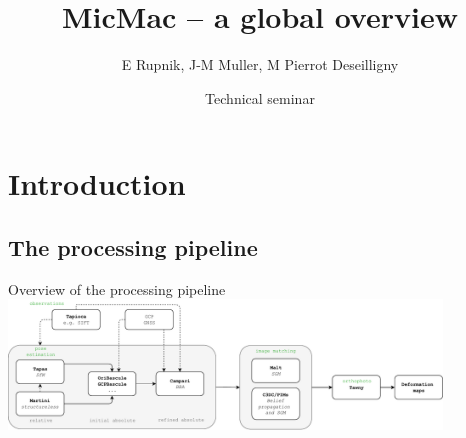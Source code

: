 \documentclass{beamer}
\title{MicMac -- a global overview}
\institute{IGN}
\date[25 May 2018]{Technical seminar}
\author[E Rupnik]{E Rupnik, J-M Muller, M Pierrot Deseilligny}
\begin{document}
    \begin{frame}[plain]
        \titlepage{}
    \end{frame}

	\tableofcontents
	

	
	
      \section{Introduction}  
        \subsection*{The processing pipeline}
            \begin{frame}{Overview of the processing pipeline}
                \centering
                \includegraphics[width=11.5cm]{images/MicMac_architecture.pdf}
                
                
            \end{frame}
\end{document}
